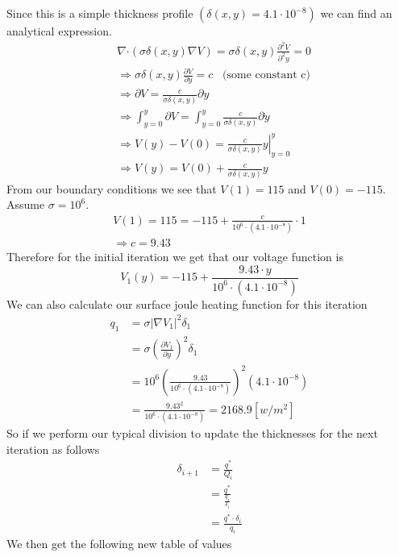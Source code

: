 \documentclass[12pt]{article}
\begin{document}
\newpage
Since this is a simple thickness profile $\left(\delta(x,y) = 4.1\cdot 10^{-8}\right)$ we can find an analytical expression.
\begin{align*}
&\nabla \boldsymbol{\cdot} (\sigma \delta(x,y) \nabla V) = \sigma \delta(x,y) \frac{\partial^2 V}{\partial^2 y} = 0\\
&\Longrightarrow \sigma \delta(x,y) \frac{\partial V}{\partial y} = c \;\;\; \textrm{(some constant c)} \\ 
&\Longrightarrow \partial V = \frac{c}{\sigma \delta(x,y)} \partial y\\
&\Longrightarrow \int_{y=0}^{y} \partial V = \int_{y=0}^{y} \frac{c}{\sigma \delta(x,y)} \partial y \\
&\Longrightarrow V(y) - V(0) = \left. \frac{c }{\sigma \delta(x,y)}y\right|_{y=0}^y \\
&\Longrightarrow V(y) = V(0) + \frac{c}{\sigma \delta(x,y)}y
\end{align*}
From our boundary conditions we see that $V(1) = 115$ and $V(0) = -115$.
Assume $\sigma = 10^6$.
\begin{gather*}
V(1) = 115 = -115 + \frac{c }{10^6\cdot(4.1\cdot10^{-8})}\cdot 1  \\
\Rightarrow c = 9.43
\end{gather*}
Therefore for the initial iteration we get that our voltage function is 
\[
V_1(y) = -115 + \frac{9.43\cdot y}{10^6 \cdot (4.1\cdot 10^{-8})}
\]
We can also calculate our surface joule heating function for this iteration
\begin{align*}
q_1 &= \sigma|\nabla V_1|^2 \delta_1 \\
&= \sigma \left(\frac{\partial V_1}{\partial y}\right)^2 \delta_1 \\
&= 10^6 \left(\frac{9.43}{10^6\cdot(4.1 \cdot 10^{-8})}\right)^2 (4.1 \cdot 10^{-8})\\
&= \frac{9.43^2}{10^6\cdot(4.1\cdot10^{-8})} = 2168.9 [w/m^2]
\end{align*}
\newpage
So if we perform our typical division to update the thicknesses for the next iteration as follows
\begin{align*}
\delta_{i+1} &= \frac{q^*}{Q_i} \\
&= \frac{q^*}{\frac{q_i}{\delta_i}} \\
&= \frac{q^* \cdot \delta_i}{q_i}
\end{align*}
We then get the following new table of values
\end{document}
